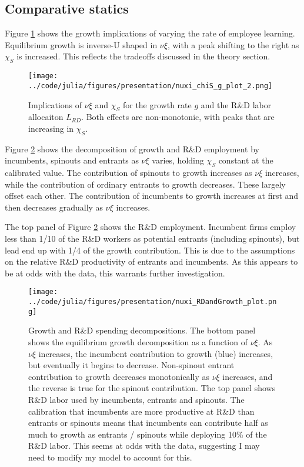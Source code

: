 \documentclass[12pt,english]{article}
\theoremstyle{remark}
\begin{document}
\subsection{Comparative statics}

Figure \ref{nuxi_chiS_gCompStat} shows the growth implications of varying the rate of employee learning. Equilibrium growth is inverse-U shaped in $\nu \xi$, with a peak shifting to the right as $\chi_S$ is increased. This reflects the tradeoffs discussed in the theory section.

\begin{figure}[h] 
 	\centering
	\texttt{[image: ../code/julia/figures/presentation/nuxi\_chiS\_g\_plot\_2.png]}
	\caption{Implications of $\nu \xi$ and $\chi_S$ for the growth rate $g$ and the R\&D labor allocaiton $L_{RD}$. Both effects are non-monotonic, with peaks that are increasing in $\chi_S$.}
	\label{nuxi_chiS_gCompStat}
\end{figure}

Figure \ref{nuxi_growthDecomposition} shows the decomposition of growth and R\&D employment by incumbents, spinouts and entrants as $\nu \xi$ varies, holding $\chi_S$ constant at the calibrated value. The contribution of spinouts to growth increases as $\nu \xi$ increases, while the contribution of ordinary entrants to growth decreases. These largely offset each other. The contribution of incumbents to growth increases at first and then decreases gradually as $\nu \xi$ increases. 

The top panel of Figure \ref{nuxi_growthDecomposition} shows the R\&D employment. Incumbent firms employ less than 1/10 of the R\&D workers as potential entrants (including spinouts), but lead end up with 1/4 of the growth contribution. This is due to the assumptions on the relative R\&D productivity of entrants and incumbents. As this appears to be at odds with the data, this warrants further investigation.

\begin{figure}[h] 
	\centering
	\texttt{[image: ../code/julia/figures/presentation/nuxi\_RDandGrowth\_plot.png]}
	\caption{Growth and R\&D spending decompositions. The bottom panel shows the equilibrium growth decomposition as a function of $\nu \xi$. As $\nu \xi$ increases, the incumbent contribution to growth (blue) increases, but eventually it begins to decrease. Non-spinout entrant contribution to growth decreases monotonically as $\nu \xi$ increases, and the reverse is true for the spinout contribution. The top panel shows R\&D labor used by incumbents, entrants and spinouts. The calibration that incumbents are more productive at R\&D than entrants or spinouts means that incumbents can contribute half as much to growth as entrants / spinouts while deploying 10\% of the R\&D labor. This seems at odds with the data, suggesting I may need to modify my model to account for this.}
	\label{nuxi_growthDecomposition}
\end{figure}
\end{document}
